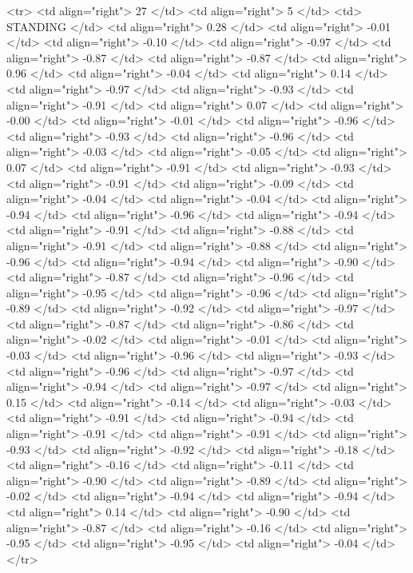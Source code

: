   <tr> <td align="right"> 27 </td> <td align="right">   5 </td> <td> STANDING </td> <td align="right"> 0.28 </td> <td align="right"> -0.01 </td> <td align="right"> -0.10 </td> <td align="right"> -0.97 </td> <td align="right"> -0.87 </td> <td align="right"> -0.87 </td> <td align="right"> 0.96 </td> <td align="right"> -0.04 </td> <td align="right"> 0.14 </td> <td align="right"> -0.97 </td> <td align="right"> -0.93 </td> <td align="right"> -0.91 </td> <td align="right"> 0.07 </td> <td align="right"> -0.00 </td> <td align="right"> -0.01 </td> <td align="right"> -0.96 </td> <td align="right"> -0.93 </td> <td align="right"> -0.96 </td> <td align="right"> -0.03 </td> <td align="right"> -0.05 </td> <td align="right"> 0.07 </td> <td align="right"> -0.91 </td> <td align="right"> -0.93 </td> <td align="right"> -0.91 </td> <td align="right"> -0.09 </td> <td align="right"> -0.04 </td> <td align="right"> -0.04 </td> <td align="right"> -0.94 </td> <td align="right"> -0.96 </td> <td align="right"> -0.94 </td> <td align="right"> -0.91 </td> <td align="right"> -0.88 </td> <td align="right"> -0.91 </td> <td align="right"> -0.88 </td> <td align="right"> -0.96 </td> <td align="right"> -0.94 </td> <td align="right"> -0.90 </td> <td align="right"> -0.87 </td> <td align="right"> -0.96 </td> <td align="right"> -0.95 </td> <td align="right"> -0.96 </td> <td align="right"> -0.89 </td> <td align="right"> -0.92 </td> <td align="right"> -0.97 </td> <td align="right"> -0.87 </td> <td align="right"> -0.86 </td> <td align="right"> -0.02 </td> <td align="right"> -0.01 </td> <td align="right"> -0.03 </td> <td align="right"> -0.96 </td> <td align="right"> -0.93 </td> <td align="right"> -0.96 </td> <td align="right"> -0.97 </td> <td align="right"> -0.94 </td> <td align="right"> -0.97 </td> <td align="right"> 0.15 </td> <td align="right"> -0.14 </td> <td align="right"> -0.03 </td> <td align="right"> -0.91 </td> <td align="right"> -0.94 </td> <td align="right"> -0.91 </td> <td align="right"> -0.91 </td> <td align="right"> -0.93 </td> <td align="right"> -0.92 </td> <td align="right"> -0.18 </td> <td align="right"> -0.16 </td> <td align="right"> -0.11 </td> <td align="right"> -0.90 </td> <td align="right"> -0.89 </td> <td align="right"> -0.02 </td> <td align="right"> -0.94 </td> <td align="right"> -0.94 </td> <td align="right"> 0.14 </td> <td align="right"> -0.90 </td> <td align="right"> -0.87 </td> <td align="right"> -0.16 </td> <td align="right"> -0.95 </td> <td align="right"> -0.95 </td> <td align="right"> -0.04 </td> </tr>
